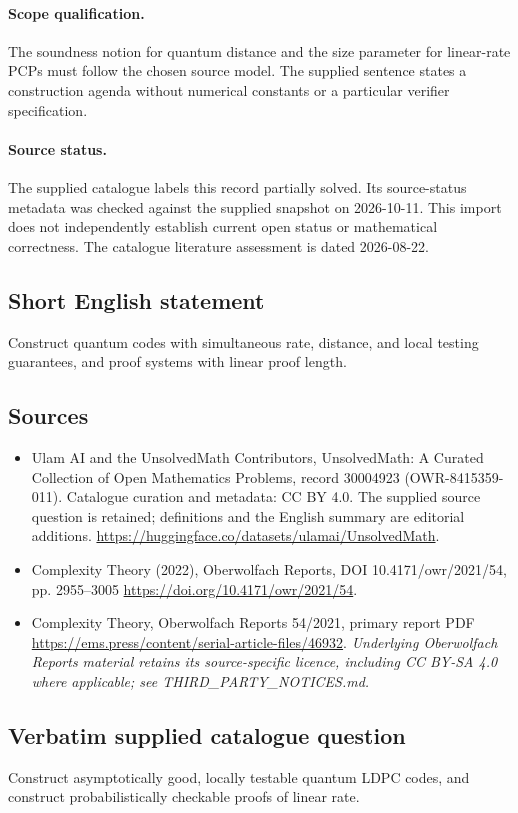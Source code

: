 \documentclass[11pt]{article}
\begin{document}
\paragraph{Scope qualification.}
The soundness notion for quantum distance and the size parameter for linear-rate PCPs must follow the chosen source model. The supplied sentence states a construction agenda without numerical constants or a particular verifier specification.
\paragraph{Source status.}
The supplied catalogue labels this record partially solved. Its source-status metadata was checked against the supplied snapshot on 2026-10-11. This import does not independently establish current open status or mathematical correctness. The catalogue literature assessment is dated 2026-08-22.
\subsection{Short English statement}
Construct quantum codes with simultaneous rate, distance, and local testing guarantees, and proof systems with linear proof length.
\subsection{Sources}
\begin{itemize}
\item[S1] Ulam AI and the UnsolvedMath Contributors, UnsolvedMath: A Curated Collection of Open Mathematics Problems, record 30004923 (OWR-8415359-011). Catalogue curation and metadata: CC BY 4.0. The supplied source question is retained; definitions and the English summary are editorial additions.
\url{https://huggingface.co/datasets/ulamai/UnsolvedMath}.
\item[S2] Complexity Theory (2022), Oberwolfach Reports, DOI 10.4171/owr/2021/54, pp. 2955--3005
\url{https://doi.org/10.4171/owr/2021/54}.
\item[S3] Complexity Theory, Oberwolfach Reports 54/2021, primary report PDF
\url{https://ems.press/content/serial-article-files/46932}.
\textit{Underlying Oberwolfach Reports material retains its source-specific licence, including CC BY-SA 4.0 where applicable; see THIRD\_PARTY\_NOTICES.md.}
\end{itemize}
\subsection{Verbatim supplied catalogue question}
Construct asymptotically good, locally testable quantum LDPC codes, and construct probabilistically checkable proofs of linear rate.
\end{document}
